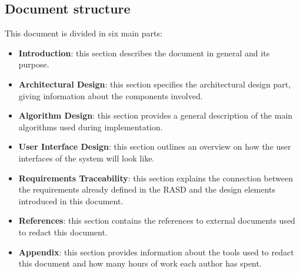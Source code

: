 	\subsection{Document structure}
		This document is divided in six main parts:
		\begin{itemize}
			\item \textbf{Introduction}: this section describes the document in general and its purpose.
			\item \textbf{Architectural Design}: this section specifies the architectural design part, giving information about the components involved.
			\item \textbf{Algorithm Design}: this section provides a general description of the main algorithms used during implementation.
			\item\textbf{ User Interface Design}: this section outlines an overview on how the user interfaces of the system will look like. 
			\item \textbf{Requirements Traceability}: this section explains the connection between the requirements already defined in the RASD and the design elements introduced in this document.
			\item \textbf{References}: this section contains the references to external documents used to redact this document.
			\item \textbf{Appendix}: this section provides information about the tools used to redact this document and how many hours of work each author has spent. 
		\end{itemize}


%